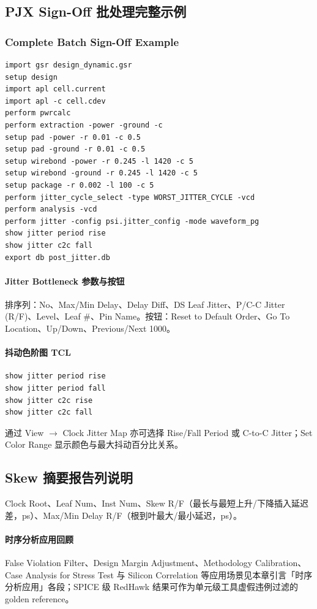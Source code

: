 \subsection{PJX Sign-Off 批处理完整示例}
\subsubsection*{Complete Batch Sign-Off Example}

\begin{lstlisting}
import gsr design_dynamic.gsr
setup design
import apl cell.current
import apl -c cell.cdev
perform pwrcalc
perform extraction -power -ground -c
setup pad -power -r 0.01 -c 0.5
setup pad -ground -r 0.01 -c 0.5
setup wirebond -power -r 0.245 -l 1420 -c 5
setup wirebond -ground -r 0.245 -l 1420 -c 5
setup package -r 0.002 -l 100 -c 5
perform jitter_cycle_select -type WORST_JITTER_CYCLE -vcd
perform analysis -vcd
perform jitter -config psi.jitter_config -mode waveform_pg
show jitter period rise
show jitter c2c fall
export db post_jitter.db
\end{lstlisting}

\paragraph{Jitter Bottleneck 参数与按钮}
排序列：No、Max/Min Delay、Delay Diff、DS Leaf Jitter、P/C-C Jitter (R/F)、Level、Leaf \#、Pin Name。按钮：Reset to Default Order、Go To Location、Up/Down、Previous/Next 1000。

\paragraph{抖动色阶图 TCL}
\begin{lstlisting}
show jitter period rise
show jitter period fall
show jitter c2c rise
show jitter c2c fall
\end{lstlisting}
通过 View $\rightarrow$ Clock Jitter Map 亦可选择 Rise/Fall Period 或 C-to-C Jitter；Set Color Range 显示颜色与最大抖动百分比关系。

\subsection{Skew 摘要报告列说明}
Clock Root、Leaf Num、Inst Num、Skew R/F（最长与最短上升/下降插入延迟差，ps）、Max/Min Delay R/F（根到叶最大/最小延迟，ps）。

\paragraph{时序分析应用回顾}
False Violation Filter、Design Margin Adjustment、Methodology Calibration、Case Analysis for Stress Test 与 Silicon Correlation 等应用场景见本章引言「时序分析应用」各段；SPICE 级 RedHawk 结果可作为单元级工具虚假违例过滤的 golden reference。

